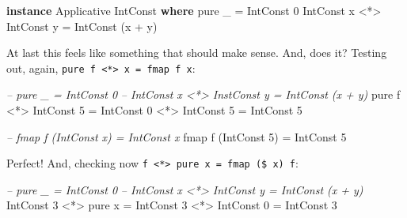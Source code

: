 \documentclass[]{article}
\newenvironment{Shaded}{}{}
\newcommand{\CommentTok}[1]{\textcolor[rgb]{0.38,0.63,0.69}{\textit{#1}}}
\newcommand{\DataTypeTok}[1]{\textcolor[rgb]{0.56,0.13,0.00}{#1}}
\newcommand{\DecValTok}[1]{\textcolor[rgb]{0.25,0.63,0.44}{#1}}
\newcommand{\FunctionTok}[1]{\textcolor[rgb]{0.02,0.16,0.49}{#1}}
\newcommand{\KeywordTok}[1]{\textcolor[rgb]{0.00,0.44,0.13}{\textbf{#1}}}
\newcommand{\NormalTok}[1]{#1}
\begin{document}
\begin{Shaded}
\begin{Highlighting}[]
\KeywordTok{instance} \DataTypeTok{Applicative} \DataTypeTok{IntConst} \KeywordTok{where}
\NormalTok{    pure _                    }\FunctionTok{=} \DataTypeTok{IntConst} \DecValTok{0}
    \DataTypeTok{IntConst}\NormalTok{ x }\FunctionTok{<*>} \DataTypeTok{IntConst}\NormalTok{ y }\FunctionTok{=} \DataTypeTok{IntConst}\NormalTok{ (x }\FunctionTok{+}\NormalTok{ y)}
\end{Highlighting}
\end{Shaded}

At last this feels like something that should make sense. And, does it? Testing
out, again, \texttt{pure\ f\ \textless{}*\textgreater{}\ x\ =\ fmap\ f\ x}:

\begin{Shaded}
\begin{Highlighting}[]
\CommentTok{-- pure _                     = IntConst 0}
\CommentTok{-- IntConst x <*> InstConst y = IntConst (x + y)}
\NormalTok{pure f }\FunctionTok{<*>} \DataTypeTok{IntConst} \DecValTok{5} \FunctionTok{=} \DataTypeTok{IntConst} \DecValTok{0} \FunctionTok{<*>} \DataTypeTok{IntConst} \DecValTok{5}
                      \FunctionTok{=} \DataTypeTok{IntConst} \DecValTok{5}
\end{Highlighting}
\end{Shaded}

\begin{Shaded}
\begin{Highlighting}[]
\CommentTok{-- fmap f (IntConst x) = IntConst x}
\NormalTok{fmap f (}\DataTypeTok{IntConst} \DecValTok{5}\NormalTok{) }\FunctionTok{=} \DataTypeTok{IntConst} \DecValTok{5}
\end{Highlighting}
\end{Shaded}

Perfect! And, checking now
\texttt{f\ \textless{}*\textgreater{}\ pure\ x\ =\ fmap\ (\$\ x)\ f}:

\begin{Shaded}
\begin{Highlighting}[]
\CommentTok{-- pure _                    = IntConst 0}
\CommentTok{-- IntConst x <*> IntConst y = IntConst (x + y)}
\DataTypeTok{IntConst} \DecValTok{3} \FunctionTok{<*>}\NormalTok{ pure x }\FunctionTok{=} \DataTypeTok{IntConst} \DecValTok{3} \FunctionTok{<*>} \DataTypeTok{IntConst} \DecValTok{0}
                      \FunctionTok{=} \DataTypeTok{IntConst} \DecValTok{3}
\end{Highlighting}
\end{Shaded}
\end{document}
